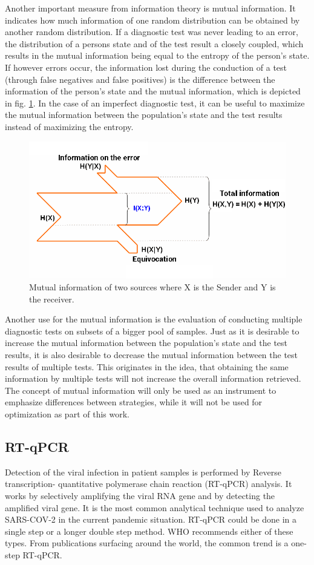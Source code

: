 \documentclass[fleqn,10pt]{wlscirep}
\begin{document}
Another important measure from information theory is mutual information. It indicates how much information of one random distribution can be obtained by another random distribution. If a diagnostic test was never leading to an error, the distribution of a persons state and of the test result a closely coupled, which results in the mutual information being equal to the entropy of the person's state. If however errors occur, the information lost during the conduction of a test (through false negatives and false positives) is the difference between the information of the person's state and the mutual information, which is depicted in fig. \ref{fig:mutual_information}. In the case of an imperfect diagnostic test, it can be useful to maximize the mutual information between the population's state and the test results instead of maximizing the entropy.\\

\begin{figure}[ht]
	\centering
	\includegraphics[width=0.7\linewidth]{pics/Entroy_XY_Eng.png}
	\caption{Mutual information of two sources where X is the Sender and Y is the receiver. }
	\label{fig:mutual_information}
\end{figure}

Another use for the mutual information is the evaluation of conducting multiple diagnostic tests on subsets of a bigger pool of samples. Just as it is desirable to increase the mutual information between the population's state and the test results, it is also desirable to decrease the mutual information between the test results of multiple tests. This originates in the idea, that obtaining the same information by multiple tests will not increase the overall information retrieved. The concept of mutual information will only be used as an instrument to emphasize differences between strategies, while it will not be used for optimization as part of this work.


\subsection{RT-qPCR}
Detection of the viral infection in patient samples is performed by Reverse transcription- quantitative polymerase chain reaction (RT-qPCR) analysis. It works by selectively amplifying the viral RNA gene and by detecting the amplified viral gene. It is the most common analytical technique used to analyze SARS-COV-2 in the current pandemic situation. RT-qPCR could be done in a single step or a longer double step method. WHO recommends either of these types. From publications surfacing around the world, the common trend is a one-step RT-qPCR.\\
\end{document}
